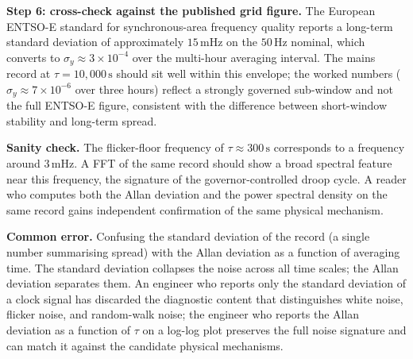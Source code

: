 \textbf{Step 6: cross-check against the published grid figure.}
The European ENTSO-E standard for synchronous-area frequency
quality reports a long-term standard deviation of approximately
$15 \,\si{\milli\hertz}$ on the $50 \,\si{\hertz}$ nominal, which
converts to $\sigma_{y} \approx 3 \times 10^{-4}$ over the
multi-hour averaging interval. The mains record at $\tau =
10{,}000 \,\si{\second}$ should sit well within this envelope;
the worked numbers ($\sigma_{y} \approx 7 \times 10^{-6}$ over
three hours) reflect a strongly governed sub-window and not the
full ENTSO-E figure, consistent with the difference between
short-window stability and long-term spread.

\textbf{Sanity check.} The flicker-floor frequency of $\tau
\approx 300 \,\si{\second}$ corresponds to a frequency around
$3 \,\si{\milli\hertz}$. A FFT of the same record should show a
broad spectral feature near this frequency, the signature of the
governor-controlled droop cycle. A reader who computes both the
Allan deviation and the power spectral density on the same record
gains independent confirmation of the same physical mechanism.

\textbf{Common error.} Confusing the standard deviation of the
record (a single number summarising spread) with the Allan
deviation as a function of averaging time. The standard deviation
collapses the noise across all time scales; the Allan deviation
separates them. An engineer who reports only the standard
deviation of a clock signal has discarded the diagnostic content
that distinguishes white noise, flicker noise, and random-walk
noise; the engineer who reports the Allan deviation as a function
of $\tau$ on a log-log plot preserves the full noise signature
and can match it against the candidate physical mechanisms.


